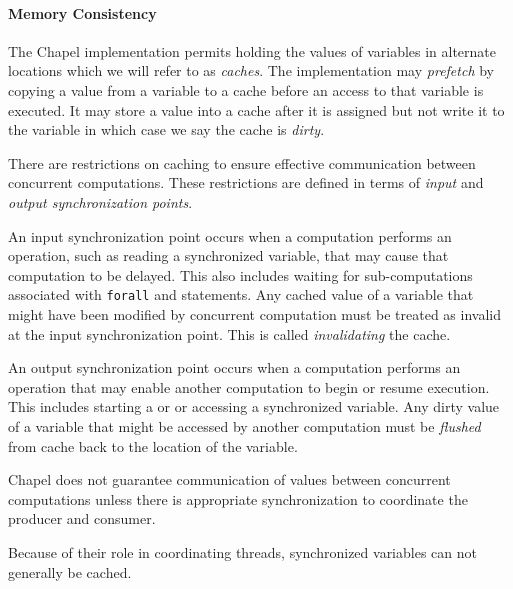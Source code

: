 \paragraph{Memory Consistency}
The Chapel implementation permits holding the values of variables in
alternate locations which we will refer to as {\em caches}.  The
implementation may {\em prefetch} by copying a value from a variable
to a cache before an access to that variable is executed. It may store
a value into a cache after it is assigned but not write it to the
variable in which case we say the cache is {\em dirty}.
 
There are restrictions on caching to ensure effective communication
between concurrent computations. These restrictions are defined in
terms of {\em input} and {\em output synchronization points}.

An input synchronization point occurs when a computation performs an
operation, such as reading a synchronized variable, that may cause
that computation to be delayed. This also includes waiting for
sub-computations associated with {\tt forall} and 
statements. Any cached value of a variable that might have been
modified by concurrent computation must be treated as invalid at the
input synchronization point.  This is called {\em invalidating} the
cache.

An output synchronization point occurs when a computation performs an
operation that may enable another computation to begin or resume
execution. This includes starting a  or  or
accessing a synchronized variable.  Any dirty value of a variable that
might be accessed by another computation must be {\em flushed} from
cache back to the location of the variable.

Chapel does not guarantee communication of values between concurrent
computations unless there is appropriate synchronization to coordinate
the producer and consumer.

Because of their role in coordinating threads, synchronized variables
can not generally be cached.
